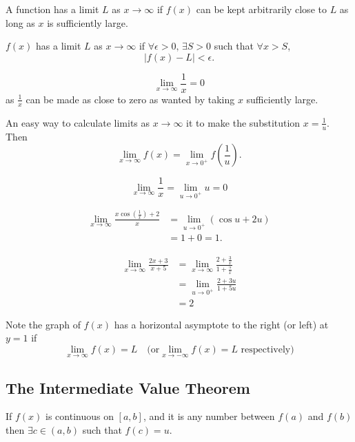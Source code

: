 \documentclass[10pt, a4paper]{article}
\begin{document}
A function has a limit $L$ as $x \rightarrow \infty$ if $f(x)$ can be kept arbitrarily close to $L$ as long as $x$ is sufficiently large.

\begin{definition}
    $f(x)$ has a limit $L$ as $x \rightarrow \infty$ if $\forall \epsilon > 0,\, \exists S > 0$ such that $\forall x > S$,
    \[
    |f(x) - L| < \epsilon.
    \]
\end{definition}

\begin{example}
    \[
    \lim_{x \rightarrow \infty}\frac{1}{x} = 0
    \]
    as $\frac{1}{x}$ can be made as close to zero as wanted by taking $x$ sufficiently large.
\end{example}

An easy way to calculate limits as $x \rightarrow \infty$ it to make the substitution $x = \frac{1}{u}$. Then 
\[
\lim_{x \rightarrow \infty} f(x) = \lim_{x \rightarrow 0^+}f\left(\frac{1}{u}\right).
\]
\begin{example}
    \[
    \lim_{x \rightarrow \infty}\frac{1}{x} = \lim_{u \rightarrow 0^+}u = 0 
    \]
\end{example}

\begin{example}
    \begin{align*}
    \lim_{x \rightarrow \infty}\frac{x\cos \left(\frac{1}{x}\right) + 2}{x} &= \lim_{u \rightarrow 0^+}(\cos u + 2u) \\
    &= 1 + 0 = 1.
    \end{align*}
\end{example}

\begin{example}
    \begin{align*}
    \lim_{x \rightarrow \infty}\frac{2x + 3}{x + 5} &= \lim_{x \rightarrow \infty}\frac{2 + \frac{3}{x}}{1 + \frac{5}{x}} \\
    &= \lim_{u \rightarrow 0^+}\frac{2 + 3u}{1 + 5u} \\
    &= 2
    \end{align*}
\end{example}

Note the graph of $f(x)$ has a horizontal asymptote to the right (or left) at $y = 1$ if
\[
\lim_{x \rightarrow \infty}f(x) = L\quad\text{(or} \lim_{x \rightarrow -\infty}f(x) = L\text{ respectively})
\]


\subsection{The Intermediate Value Theorem}
If $f(x)$ is continuous on $[a, b]$, and it is any number between $f(a)$ and $f(b)$ then $\exists c \in (a, b)$ such that $f(c) = u$.
\end{document}
